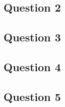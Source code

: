 \documentclass[a4paper, titlepage]{article}
\begin{document}
\subsection{Question 2}

\clearpage

\subsection{Question 3}

\clearpage

\subsection{Question 4}

\clearpage

\subsection{Question 5}

\clearpage
\end{document}
